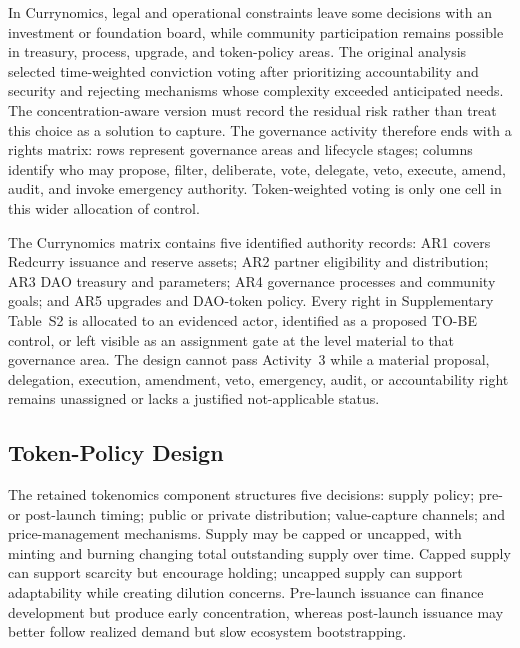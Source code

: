 \documentclass[referee,sn-basic]{sn-jnl}
\begin{document}
In Currynomics, legal and operational constraints leave some decisions with an
investment or foundation board, while community participation remains possible
in treasury, process, upgrade, and token-policy areas. The original analysis
selected time-weighted conviction voting after prioritizing accountability and
security and rejecting mechanisms whose complexity exceeded anticipated needs.
The concentration-aware version must record the residual risk rather than treat
this choice as a solution to capture. The governance activity therefore ends
with a rights matrix: rows represent governance areas and lifecycle stages;
columns identify who may propose, filter, deliberate, vote, delegate, veto,
execute, amend, audit, and invoke emergency authority. Token-weighted voting is
only one cell in this wider allocation of control.

The Currynomics matrix contains five identified authority records: AR1 covers
Redcurry issuance and reserve assets; AR2 partner eligibility and distribution;
AR3 DAO treasury and parameters; AR4 governance processes and community goals;
and AR5 upgrades and DAO-token policy. Every right in Supplementary Table~S2
is allocated to an evidenced actor, identified as a proposed TO-BE control, or
left visible as an assignment gate at the level material to that governance
area. The design cannot pass Activity~3 while a material proposal, delegation,
execution, amendment, veto, emergency, audit, or accountability right remains
unassigned or lacks a justified not-applicable status.

\subsection{Token-Policy Design}\label{subsec:token-policy}

The retained tokenomics component structures five decisions: supply policy;
pre- or post-launch timing; public or private distribution; value-capture
channels; and price-management mechanisms. Supply may be capped or uncapped,
with minting and burning changing total outstanding supply over time. Capped supply
can support scarcity but encourage holding; uncapped supply can support
adaptability while creating dilution concerns. Pre-launch issuance can finance
development but produce early concentration, whereas post-launch issuance may
better follow realized demand but slow ecosystem bootstrapping.
\end{document}
